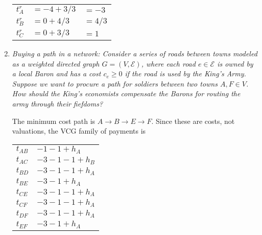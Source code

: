 \documentclass[10pt]{article}
\begin{document}
\begin{spacing}{1.0}
\begin{enumerate}
  \begin{tabular}{lll}
    $t_A^r$ & $= -4 + 3/3$ & $= -3$ \\
    $t_B^r$ & $= 0 + 4/3$ & $= 4/3$ \\
    $t_C^r$ & $= 0 + 3/3$ & $= 1$
  \end{tabular}

\item \textit{Buying a path in a network: Consider a series of roads
    between towns modeled as a weighted directed graph
    $G=(V,\mathcal{E})$, where each road $e\in \mathcal{E}$ is owned by a
    local Baron and has a cost $c_e \geq 0$ if the road is used by the
    King's Army. Suppose we want to procure a path for soldiers between
    two towns $A,F \in V$. How should the King's economists compensate the
    Barons for routing the army through their fiefdoms?}
    \begin{center}
    \end{center}

    The minimum cost path is $A\to B \to E \to F$. Since these are costs,
    not valuations, the VCG family of payments is

    \begin{tabular}{ll}
    $t_{AB}$ & $-1 -1 + h_A$ \\
    $t_{AC}$ & $-3-1-1 + h_B$ \\
    $t_{BD}$ & $-3-1-1 + h_A$ \\
    $t_{BE}$ & $-3-1 + h_A$ \\
    $t_{CE}$ & $-3-1-1 + h_A$ \\
    $t_{CF}$ & $-3-1-1 + h_A$ \\
    $t_{DF}$ & $-3-1-1 + h_A$ \\
    $t_{EF}$ & $-3-1 + h_A$
    \end{tabular}


\end{enumerate}
\end{spacing}
\end{document}
